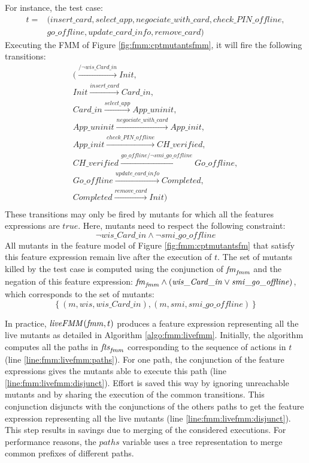 For instance, the test case:
\begin{align*}
t =  & (\mathit{insert\_card}, \mathit{select\_app}, \mathit{negociate\_with\_card}, \mathit{check\_PIN\_offline},\\
 & \mathit{go\_offline}, \mathit{update\_card\_info}, \mathit{remove\_card})
\end{align*}
Executing the FMM of Figure \ref{fig:fmm:cptmutantsfmm}, it will fire the following transitions:
%
\begin{gather*}
( \xrightarrow{/\neg \mathit{wis\_Card\_in}} \mathit{Init},\\
 \mathit{Init} \xrightarrow{\mathit{insert\_card}} \mathit{Card\_in}, \\
 \mathit{Card\_in}  \xrightarrow{\mathit{select\_app}} \mathit{App\_uninit}, \\
 \mathit{App\_uninit} \xrightarrow{\mathit{negociate\_with\_card}} \mathit{App\_init}, \\
 \mathit{App\_init} \xrightarrow{\mathit{check\_PIN\_offline}} \mathit{CH\_verified}, \\
 \mathit{CH\_verified} \xrightarrow{\mathit{go\_offline}/\neg \mathit{smi\_go\_offline}} \mathit{Go\_offline}, \\
 \mathit{Go\_offline}  \xrightarrow{\mathit{update\_card\_info}} \mathit{Completed}, \\
 \mathit{Completed} \xrightarrow{\mathit{remove\_card}} \mathit{Init}) \\
\end{gather*}
%
These transitions may only be fired by mutants for which all the features expressions are $true$. Here, mutants need to respect the following constraint:
$$\neg \mathit{wis\_Card\_in} \wedge \mathit{\neg smi\_go\_offline}$$
All mutants in the feature model of Figure \ref{fig:fmm:cptmutantsfm} that satisfy this feature expression remain live after the execution of $t$. The set of mutants killed by the test case is computed using the conjunction of $\mathit{fm}_{\mathit{fmm}}$ and the negation of this feature expression: $\mathit{fm}_{\mathit{fmm}} \wedge (\mathit{wis\_Card\_in} \vee \mathit{smi\_go\_offline})$, which corresponds to the set of mutants: 
$$\left\lbrace(m, \mathit{wis}, \mathit{wis\_Card\_in}), (m, \mathit{smi}, \mathit{smi\_go\_offline}) \right\rbrace$$

In practice, $\mathit{liveFMM}(\mathit{fmm}, t)$ produces a feature expression representing all the live mutants as detailed in Algorithm \ref{algo:fmm:livefmm}. Initially, the algorithm computes all the paths in $\mathit{fts}_\mathit{{fmm}}$ corresponding to the sequence of actions in $t$ (line \ref{line:fmm:livefmm:paths}). For one path, the conjunction of the feature expressions gives the mutants able to execute this path (line \ref{line:fmm:livefmm:disjunct}). Effort is saved this way by ignoring unreachable mutants and by sharing the execution of the common transitions. This conjunction disjuncts with the conjunctions of the others paths to get the feature expression representing all the live mutants (line \ref{line:fmm:livefmm:disjunct}). This step results in savings due to merging of the considered executions. For performance reasons, the $\mathit{paths}$ variable uses a tree representation to merge common prefixes of different paths.

